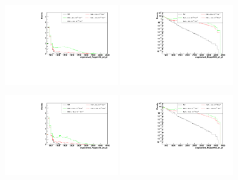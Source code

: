 \begin{figure}[h]
  \begin{center}
	\includegraphics[width=0.45\textwidth]{Plots/aQGC_kinematics/ungroomed_PuppiAK8_jet_pt_FM6.pdf}%
	\includegraphics[width=0.45\textwidth]{Plots/aQGC_kinematics/ungroomed_PuppiAK8_jet_pt_FM6_log.pdf}\\		
    \caption{}
  \end{center}
\end{figure}
\begin{figure}[h]
  \begin{center}
	\includegraphics[width=0.45\textwidth]{Plots/aQGC_kinematics/ungroomed_PuppiAK8_jet_pt_FM7.pdf}%
	\includegraphics[width=0.45\textwidth]{Plots/aQGC_kinematics/ungroomed_PuppiAK8_jet_pt_FM7_log.pdf}\\		
    \caption{}
  \end{center}
\end{figure}
